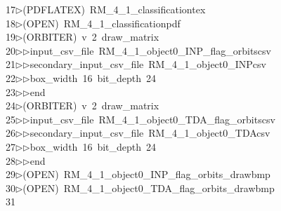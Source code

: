 \begin{tabbing}
17\>$\triangleright$\>(PDFLATEX)\ RM\_4\_1\_classificationtex\\[0pt]
18\>$\triangleright$\>(OPEN)\ RM\_4\_1\_classificationpdf\\[0pt]
19\>$\triangleright$\>(ORBITER)\ v\ 2\ draw\_matrix\ \\[0pt]
20\>$\triangleright$\>$\triangleright$\>input\_csv\_file\ RM\_4\_1\_object0\_INP\_flag\_orbitscsv\ \\[0pt]
21\>$\triangleright$\>$\triangleright$\>secondary\_input\_csv\_file\ RM\_4\_1\_object0\_INPcsv\ \\[0pt]
22\>$\triangleright$\>$\triangleright$\>box\_width\ 16\ bit\_depth\ 24\ \\[0pt]
23\>$\triangleright$\>$\triangleright$\>end\\[0pt]
24\>$\triangleright$\>(ORBITER)\ v\ 2\ draw\_matrix\ \\[0pt]
25\>$\triangleright$\>$\triangleright$\>input\_csv\_file\ RM\_4\_1\_object0\_TDA\_flag\_orbitscsv\ \\[0pt]
26\>$\triangleright$\>$\triangleright$\>secondary\_input\_csv\_file\ RM\_4\_1\_object0\_TDAcsv\ \\[0pt]
27\>$\triangleright$\>$\triangleright$\>box\_width\ 16\ bit\_depth\ 24\ \\[0pt]
28\>$\triangleright$\>$\triangleright$\>end\\[0pt]
29\>$\triangleright$\>(OPEN)\ RM\_4\_1\_object0\_INP\_flag\_orbits\_drawbmp\\[0pt]
30\>$\triangleright$\>(OPEN)\ RM\_4\_1\_object0\_TDA\_flag\_orbits\_drawbmp\\[0pt]
31\>\end{tabbing}
